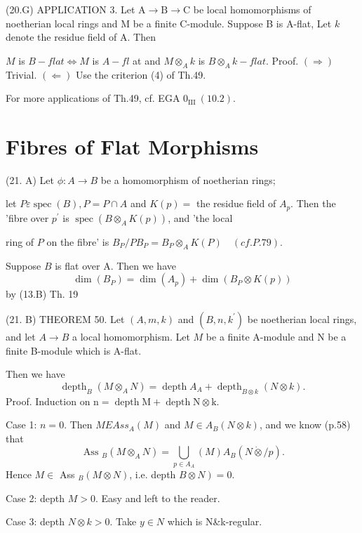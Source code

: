 (20.G) APPLICATION 3. Let $\mathrm{A} \rightarrow \mathrm{B} \rightarrow \mathrm{C}$ be local homomorphisms of noetherian local rings and M be a finite C-module. Suppose B is A-flat, Let $k$ denote the residue field of A. Then

$M$ is $B-f l a t \Leftrightarrow M$ is $A-f l$ at and $M \otimes_{A} k$ is $B \otimes_{A} k-f l a t .$ Proof. $(\Rightarrow)$ Trivial. $(\Leftarrow)$ Use the criterion (4) of Th.49.

For more applications of Th.49, cf. EGA $0_{\text {III }}(10.2)$.

\section{Fibres of Flat Morphisms}
(21. A) Let $\phi: A \rightarrow B$ be a homomorphism of noetherian rings;

let $P \varepsilon \operatorname{spec}(B), P=P \cap A$ and $K(p)=$ the residue field of $A_{p}$. Then the 'fibre over $p^{\prime}$ is $\operatorname{spec}\left(B \otimes_{A} K(p)\right)$, and 'the local

ring of $P$ on the fibre' is $B_{P} / P B_{P}=B_{P} \otimes_{A} K(P) \quad(c f . P .79)$.

Suppose $B$ is flat over A. Then we have
$$
\operatorname{dim}\left(B_{P}\right)=\operatorname{dim}\left(A_{p}\right)+\operatorname{dim}\left(B_{P} \otimes K(p)\right)
$$
by (13.B) Th. 19

(21. B) THEOREM 50. Let $(A, m, k)$ and $\left(B, n, k^{\prime}\right)$ be noetherian local rings, and let $A \rightarrow B$ a local homomorphism. Let $M$ be a finite A-module and $\mathrm{N}$ be a finite B-module which is A-flat.

Then we have
$$
\operatorname{depth}_{B}\left(M \otimes_{A} N\right)=\operatorname{depth} A_{A}+\operatorname{depth}_{B \otimes k}(N \otimes k) .
$$
Proof. Induction on $\mathrm{n}=\operatorname{depth} \mathrm{M}+\operatorname{depth} \mathrm{N} \otimes \mathrm{k}$.

Case 1: $n=0$. Then $M E A s s_{A}(M)$ and $M \in A_{B}(N \otimes k)$, and we know (p.58) that
$$
\text { Ass }_{B}\left(M \otimes_{A} N\right)=\bigcup_{p \in A_{A}}(M) A_{B}(N \dot{\otimes} / p) .
$$
Hence $M \in$ Ass $_{B}(M \otimes N)$, i.e. depth $\left.B \otimes N\right)=0$.

Case 2: depth $M>0$. Easy and left to the reader.

Case 3: depth $N \otimes k>0$. Take $y \in N$ which is N\&k-regular.

